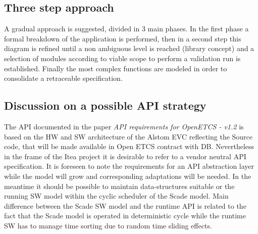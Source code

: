 \documentclass{template/openetcs_report}
\begin{document}
\subsection{Three step approach}
A gradual approach is suggested, divided in 3 main phases. In the first phase a formal breakdown of the application is performed, then in a second step this diagram is refined until a non ambiguous level is reached (library concept) and a selection of modules according to viable scope to perform a validation run is established. Finally the most complex functions are modeled in order to consolidate a retraceable specification.

\subsection{Discussion on a possible API strategy}
The API documented in the paper \emph{API requirements for OpenETCS - v1.2} is based on the HW and SW architecture of the Alstom EVC reflecting the Source code, that will be made available in Open ETCS contract with DB. Nevertheless in the frame of the Itea project it is desirable to refer to a vendor neutral API specification. It is foreseen to note the requirements for an API abstraction layer while the model will grow and corresponding adaptations will be needed. In the meantime it should be possible to maintain data-structures suitable or the running SW model within the cyclic scheduler of the Scade model. Main difference between the Scade SW model and the runtime API is related to the fact that the Scade model is operated in deterministic cycle while the runtime SW has to manage time sorting due to random time sliding effects.
\end{document}
